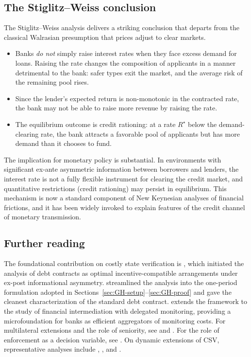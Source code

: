 \documentclass[11pt,a4paper,oneside]{book}
\theoremstyle{plain}
\theoremstyle{definition}
\theoremstyle{remark}
\numberwithin{equation}{chapter}
\begin{document}
\subsection{The Stiglitz--Weiss conclusion}

The Stiglitz--Weiss analysis delivers a striking conclusion that departs from the classical Walrasian presumption that prices adjust to clear markets.

\begin{itemize}
  \item Banks \emph{do not} simply raise interest rates when they face excess demand for loans.
  Raising the rate changes the composition of applicants in a manner detrimental to the bank: safer types exit the market, and the average risk of the remaining pool rises.
  \item Since the lender's expected return is non-monotonic in the contracted rate, the bank may not be able to raise more revenue by raising the rate.
  \item The equilibrium outcome is credit rationing: at a rate $R^\star$ below the demand-clearing rate, the bank attracts a favorable pool of applicants but has more demand than it chooses to fund.
\end{itemize}

The implication for monetary policy is substantial.
In environments with significant ex-ante asymmetric information between borrowers and lenders, the interest rate is not a fully flexible instrument for clearing the credit market, and quantitative restrictions (credit rationing) may persist in equilibrium.
This mechanism is now a standard component of New Keynesian analyses of financial frictions, and it has been widely invoked to explain features of the credit channel of monetary transmission.

\subsection{Further reading}

The foundational contribution on costly state verification is \citet{Townsend1979}, which initiated the analysis of debt contracts as optimal incentive-compatible arrangements under ex-post informational asymmetry.
\citet{GaleHellwig1985} streamlined the analysis into the one-period formulation adopted in Sections~\ref{sec:GH-setup}--\ref{sec:GH-proof} and gave the cleanest characterization of the standard debt contract.
\citet{Diamond1984} extends the framework to the study of financial intermediation with delegated monitoring, providing a microfoundation for banks as efficient aggregators of monitoring costs.
For multilateral extensions and the role of seniority, see \citet{KrasaVillamil1994} and \citet{Winton1995}.
For the role of enforcement as a decision variable, see \citet{KrasaVillamil2000}.
On dynamic extensions of CSV, representative analyses include \citet{Chang1990}, \citet{Webb1992}, and \citet{HartMoore1998}.
\end{document}
